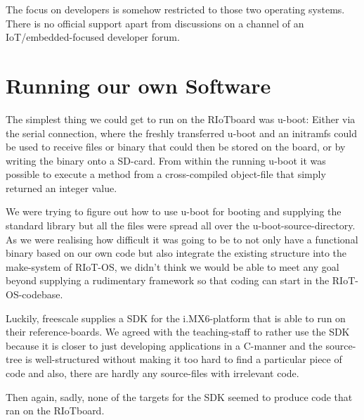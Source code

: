 The focus on developers is somehow restricted to those two operating systems. There is no
official support apart from discussions on a channel of an IoT/embedded-focused developer
forum.

\section{Running our own Software}

The simplest thing we could get to run on the RIoTboard was u-boot: Either via the serial
connection, where the freshly transferred u-boot and an initramfs could be used to
receive files or binary that could then be stored on the board, or by writing the binary
onto a SD-card. From within the running u-boot it was possible to execute a method from
a cross-compiled object-file that simply returned an integer value.

We were trying to figure out how to use u-boot for booting and supplying the standard
library but all the files were spread all over the u-boot-source-directory.
As we were realising how difficult it was going to be to not only have a functional
binary based on our own code but also integrate the existing structure into the
make-system of RIoT-OS, we didn't think we would be able to meet any goal beyond
supplying a rudimentary framework so that coding can start in the RIoT-OS-codebase.

Luckily, freescale supplies a SDK for the i.MX6-platform that is able to run on their
reference-boards. We agreed with the teaching-staff to rather use the SDK because it is
closer to just developing applications in a C-manner and the source-tree is
well-structured without making it too hard to find a particular piece of code and also,
there are hardly any source-files with irrelevant code.

Then again, sadly, none of the targets for the SDK seemed to produce code that ran on the
RIoTboard.
